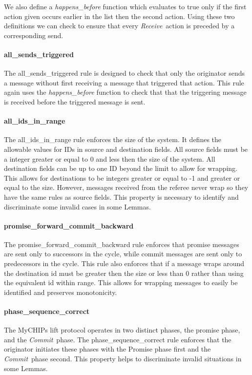\documentclass[runningheads]{llncs}
\newcommand{\receive}{\emph{Receive}}
\newcommand{\commit}{\emph{Commit}}
\begin{document}
We also define a \emph{happens\_before} function which evaluates to true only if the first action given occurs earlier in the list then the second action. 
Using these two definitions we can check to ensure that every \receive\ action is preceded by a corresponding send. 

\paragraph{all\_sends\_triggered}
The all\_sends\_triggered rule is designed to check that only the originator sends a message without first receiving a message that triggered that action. This rule again uses the \emph{happens\_before} function to check that that the triggering message is received before the triggered message is sent. 

\paragraph{all\_ids\_in\_range}
The all\_ids\_in\_range rule enforces the size of the system. It defines the allowable values for IDs in source and destination fields. All source fields must be a integer greater or equal to 0 and less then the size of the system. All destination fields can be up to one ID beyond the limit to allow for wrapping. This allows for destinations to be integers greater or equal to -1 and greater or equal to the size. However, messages received from the referee never wrap so they have the same rules as source fields. This property is necessary to identify and discriminate some invalid cases in some Lemmas. 

\paragraph{promise\_forward\_commit\_backward}
The promise\_forward\_commit\_backward rule enforces that promise messages are sent only to successors in the cycle, while commit messages are sent only to predecessors in the cycle. This rule also enforces that if a message wraps around the destination id must be greater then the size or less than 0 rather than using the equivalent id within range. This allows for wrapping messages to easily be identified and preserves monotonicity.

\paragraph{phase\_sequence\_correct}
The MyCHIPs lift protocol operates in two distinct phases, the promise phase, and the \commit\ phase. The phase\_sequence\_correct rule enforces that the originator initiates these phases with the Promise phase first and the \commit\ phase second. This property helps to discriminate invalid situations in some Lemmas.
\end{document}
